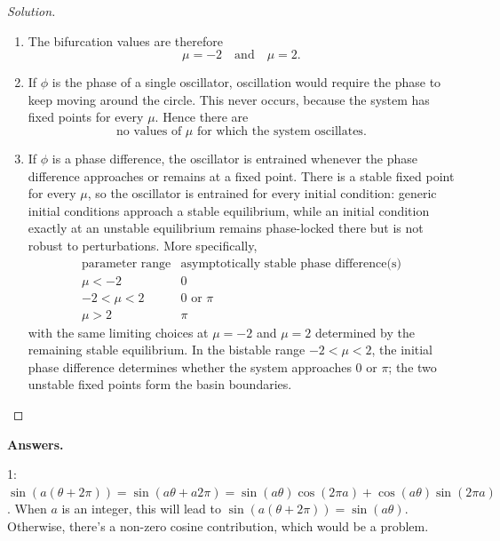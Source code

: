 \documentclass[12pt]{amsart}
\theoremstyle{conjecture}
\theoremstyle{definition}
\theoremstyle{question}
\theoremstyle{theorem}
\newenvironment{solution}
{\begin{proof}[Solution]}
{\end{proof}}
\begin{document}
\begin{enumerate}
\begin{solution}
\begin{enumerate}[label=(\alph*),leftmargin=2.6em,itemsep=0.55em]
              \item The bifurcation values are therefore
              \[
                  \boxed{\mu=-2\quad\text{and}\quad\mu=2}.
              \]

              \item If $\phi$ is the phase of a single oscillator, oscillation would
              require the phase to keep moving around the circle. This never occurs,
              because the system has fixed points for every $\mu$. Hence there are
              \[
                  \boxed{\text{no values of $\mu$ for which the system oscillates.}}
              \]

              \item If $\phi$ is a phase difference, the oscillator is entrained
              whenever the phase difference approaches or remains at a fixed point.
              There is a stable fixed point for every $\mu$, so the oscillator is
              entrained for every initial condition: generic initial conditions approach
              a stable equilibrium, while an initial condition exactly at an unstable
              equilibrium remains phase-locked there but is not robust to perturbations.
              More specifically,
              \[
                  \begin{array}{c|c}
                      \text{parameter range}&\text{asymptotically stable phase difference(s)}\\ \hline
                      \mu<-2&0\\
                      -2<\mu<2&0\text{ or }\pi\\
                      \mu>2&\pi
                  \end{array}
              \]
              \newpage
              with the same limiting choices at $\mu=-2$ and $\mu=2$ determined by
              the remaining stable equilibrium. In the bistable range
              $-2<\mu<2$, the initial phase difference determines whether the system
              approaches $0$ or $\pi$; the two unstable fixed points form the basin
              boundaries.
            \end{enumerate}
        \end{solution}
    \end{enumerate}

    \textbf{Answers.}

    \hspace*{1.5em}1: $\sin(a(\theta+2\pi))=\sin(a\theta+a2\pi)=\sin(a\theta)\cos(2\pi a)+
    \cos(a\theta)\sin(2\pi a)$. When $a$ is an integer, this will lead to
    $\sin(a(\theta+2\pi))=\sin(a\theta)$. Otherwise, there's a non-zero cosine contribution, which would
    be a problem.
\end{document}
